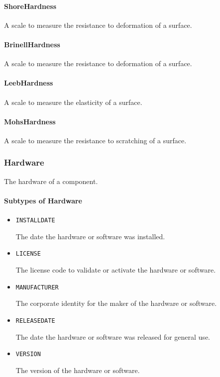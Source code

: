 \paragraph{ShoreHardness}\mbox{}
\label{sec:ShoreHardness}


A scale to measure the resistance to deformation of a surface.


\paragraph{BrinellHardness}\mbox{}
\label{sec:BrinellHardness}


A scale to measure the resistance to deformation of a surface.


\paragraph{LeebHardness}\mbox{}
\label{sec:LeebHardness}


A scale to measure the elasticity of a surface.


\paragraph{MohsHardness}\mbox{}
\label{sec:MohsHardness}


A scale to measure the resistance to scratching of a surface.


\subsubsection{Hardware}




The hardware of a component.


\paragraph{Subtypes of Hardware}\mbox{}
\label{sec:Subtypes of Hardware}

\begin{itemize}

\item \texttt{INSTALL\textunderscore DATE}


The date the hardware or software was installed.

\item \texttt{LICENSE}


The license code to validate or activate the hardware or software.

\item \texttt{MANUFACTURER}


The corporate identity for the maker of the hardware or software.


\item \texttt{RELEASE\textunderscore DATE}


The date the hardware or software was released for general use.


\item \texttt{VERSION}


The version of the hardware or software.


\end{itemize}

